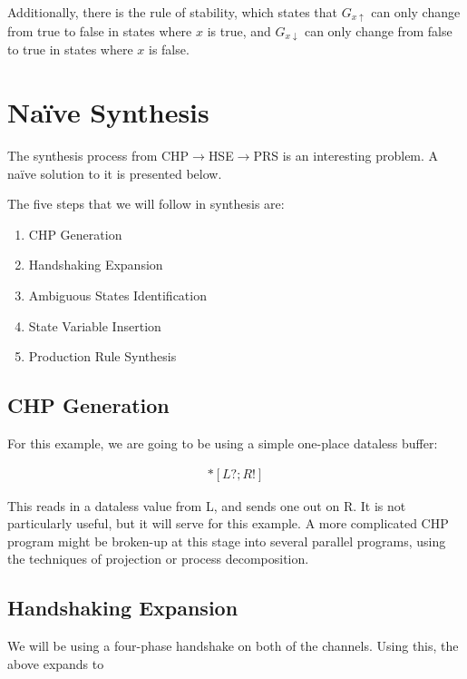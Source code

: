 \documentclass[times,10pt]{article}
\begin{document}
Additionally, there is the rule of stability, which states that $G_{x\uparrow}$ can only change from true to false in states where $x$ is true, and $G_{x\downarrow}$ can only change from false to true in states where $x$ is false.

\section{Na\"{i}ve Synthesis} 

The synthesis process from CHP$\rightarrow$HSE$\rightarrow$PRS is an interesting problem.  A na\"{i}ve solution to it is presented below.

The five steps that we will follow in synthesis are:

\begin{enumerate}
\item CHP Generation
\item Handshaking Expansion
\item Ambiguous States Identification
\item State Variable Insertion
\item Production Rule Synthesis
\end{enumerate}

\subsection{CHP Generation}

For this example, we are going to be using a simple one-place dataless buffer:

\begin{align*}
*[L?;R!]
\end{align*}

This reads in a dataless value from L, and sends one out on R.  It is not particularly useful, but it will serve for this example.  A more complicated CHP program might be broken-up at this stage into several parallel programs, using the techniques of projection or process decomposition. 

\subsection{Handshaking Expansion}

We will be using a four-phase handshake on both of the channels.  Using this, the above expands to

\end{document}
